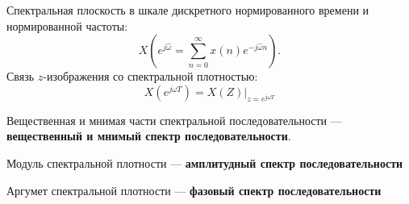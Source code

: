 \documentclass[a4paper, 14pt]{extarticle}
\begin{document}
Спектральная плоскость в шкале дискретного нормированного времени и нормированной частоты:
\begin{equation}
    X(e^{j\hat{ \omega }} = \sum^{\infty}_{n=0} x(n)e^{-j \hat{ \omega }n}).
\end{equation}
Связь $z$-изображения со спектральной плотностью:
\begin{equation}
    X(e^{j\omega T}) = X(Z) \big\vert_{z=e^{j\omega T}}
\end{equation}

Вещественная и мнимая части спектральной последовательности --- \textbf{вещественный и мнимый спектр последовательности}.

Модуль спектральной плотности --- \textbf{амплитудный спектр последовательности}

Аргумет спектральной плотности --- \textbf{фазовый спектр последовательности}
\end{document}

